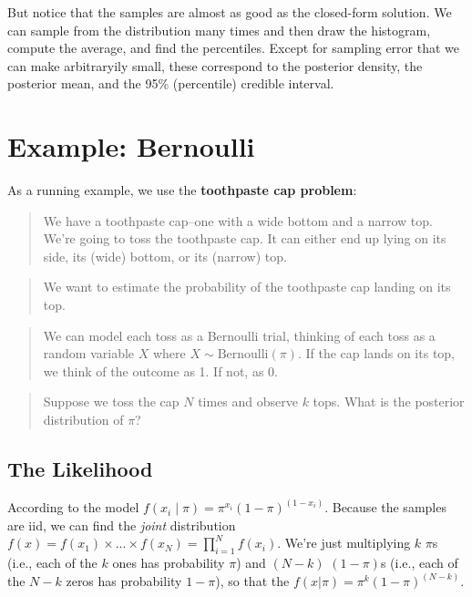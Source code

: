\documentclass[
]{book}
\begin{document}
But notice that the samples are almost as good as the closed-form solution. We can sample from the distribution many times and then draw the histogram, compute the average, and find the percentiles. Except for sampling error that we can make arbitraryily small, these correspond to the posterior density, the posterior mean, and the 95\% (percentile) credible interval.

\hypertarget{example-bernoulli}{%
\section{Example: Bernoulli}\label{example-bernoulli}}

As a running example, we use the \textbf{toothpaste cap problem}:

\begin{quote}
We have a toothpaste cap--one with a wide bottom and a narrow top. We're going to toss the toothpaste cap. It can either end up lying on its side, its (wide) bottom, or its (narrow) top.
\end{quote}

\begin{quote}
We want to estimate the probability of the toothpaste cap landing on its top.
\end{quote}

\begin{quote}
We can model each toss as a Bernoulli trial, thinking of each toss as a random variable \(X\) where \(X \sim \text{Bernoulli}(\pi)\). If the cap lands on its top, we think of the outcome as 1. If not, as 0.
\end{quote}

\begin{quote}
Suppose we toss the cap \(N\) times and observe \(k\) tops. What is the posterior distribution of \(\pi\)?
\end{quote}

\hypertarget{likelihood}{%
\subsection{The Likelihood}\label{likelihood}}

According to the model \(f(x_i \mid \pi) = \pi^{x_i} (1 - \pi)^{(1 - x_i)}\). Because the samples are iid, we can find the \emph{joint} distribution \(f(x) = f(x_1) \times ... \times f(x_N) = \prod_{i = 1}^N f(x_i)\). We're just multiplying \(k\) \(\pi\)s (i.e., each of the \(k\) ones has probability \(\pi\)) and \((N - k)\) \((1 - \pi)\)s (i.e., each of the \(N - k\) zeros has probability \(1 - \pi\)), so that the \(f(x | \pi) = \pi^{k} (1 - \pi)^{(N - k)}\).
\end{document}
